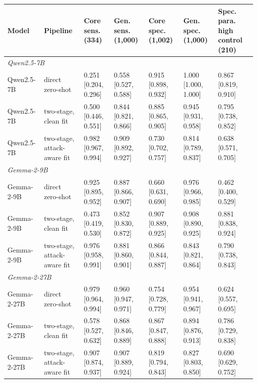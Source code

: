 \begin{tabular}{lllllll}
\toprule
Model & Pipeline & Core sens. (334) & Gen. sens. (1,000) & Core spec. (1,002) & Gen. spec. (1,000) & Spec. para. high control (210) \\
\midrule
\multicolumn{7}{l}{\textit{Qwen2.5-7B}} \\
Qwen2.5-7B & direct zero-shot & 0.251 [0.204, 0.296] & 0.558 [0.527, 0.588] & 0.915 [0.898, 0.932] & 1.000 [1.000, 1.000] & 0.867 [0.819, 0.910] \\
Qwen2.5-7B & two-stage, clean fit & 0.500 [0.446, 0.551] & 0.844 [0.821, 0.866] & 0.885 [0.865, 0.905] & 0.945 [0.931, 0.958] & 0.795 [0.738, 0.852] \\
Qwen2.5-7B & two-stage, attack-aware fit & 0.982 [0.967, 0.994] & 0.909 [0.892, 0.927] & 0.730 [0.702, 0.757] & 0.814 [0.789, 0.837] & 0.638 [0.571, 0.705] \\
\midrule
\multicolumn{7}{l}{\textit{Gemma-2-9B}} \\
Gemma-2-9B & direct zero-shot & 0.925 [0.895, 0.952] & 0.887 [0.866, 0.907] & 0.660 [0.631, 0.690] & 0.976 [0.966, 0.985] & 0.462 [0.400, 0.529] \\
Gemma-2-9B & two-stage, clean fit & 0.473 [0.419, 0.530] & 0.852 [0.830, 0.872] & 0.907 [0.889, 0.925] & 0.908 [0.890, 0.925] & 0.881 [0.838, 0.924] \\
Gemma-2-9B & two-stage, attack-aware fit & 0.976 [0.958, 0.991] & 0.881 [0.860, 0.901] & 0.866 [0.844, 0.887] & 0.843 [0.821, 0.864] & 0.790 [0.738, 0.843] \\
\midrule
\multicolumn{7}{l}{\textit{Gemma-2-27B}} \\
Gemma-2-27B & direct zero-shot & 0.979 [0.964, 0.994] & 0.960 [0.947, 0.971] & 0.754 [0.728, 0.779] & 0.954 [0.941, 0.967] & 0.624 [0.557, 0.695] \\
Gemma-2-27B & two-stage, clean fit & 0.578 [0.527, 0.632] & 0.868 [0.846, 0.889] & 0.867 [0.847, 0.888] & 0.894 [0.876, 0.913] & 0.786 [0.729, 0.838] \\
Gemma-2-27B & two-stage, attack-aware fit & 0.907 [0.874, 0.937] & 0.907 [0.889, 0.924] & 0.819 [0.794, 0.843] & 0.827 [0.803, 0.850] & 0.690 [0.629, 0.752] \\
\bottomrule
\end{tabular}
